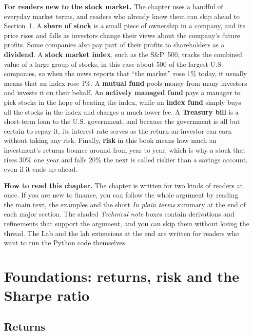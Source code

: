 \begin{callout}
\textbf{For readers new to the stock market.} The chapter uses a handful of everyday market terms, and readers who already know them can skip ahead to Section~\ref{sec:01-foundations}. A \textbf{share of stock} is a small piece of ownership in a company, and its price rises and falls as investors change their views about the company's future profits. Some companies also pay part of their profits to shareholders as a \textbf{dividend}. A \textbf{stock market index}, such as the S\&P~500, tracks the combined value of a large group of stocks, in this case about 500 of the largest U.S. companies, so when the news reports that ``the market'' rose 1\% today, it usually means that an index rose 1\%. A \textbf{mutual fund} pools money from many investors and invests it on their behalf. An \textbf{actively managed fund} pays a manager to pick stocks in the hope of beating the index, while an \textbf{index fund} simply buys all the stocks in the index and charges a much lower fee. A \textbf{Treasury bill} is a short-term loan to the U.S. government, and because the government is all but certain to repay it, its interest rate serves as the return an investor can earn without taking any risk. Finally, \textbf{risk} in this book means how much an investment's returns bounce around from year to year, which is why a stock that rises 30\% one year and falls 20\% the next is called riskier than a savings account, even if it ends up ahead.
\end{callout}

\begin{callout}
\textbf{How to read this chapter.} The chapter is written for two kinds of readers at once. If you are new to finance, you can follow the whole argument by reading the main text, the examples and the short \emph{In plain terms} summary at the end of each major section. The shaded \emph{Technical note} boxes contain derivations and refinements that support the argument, and you can skip them without losing the thread. The Lab and the lab extensions at the end are written for readers who want to run the Python code themselves.
\end{callout}

\section{Foundations: returns, risk and the Sharpe ratio}
\label{sec:01-foundations}

\subsection{Returns}

